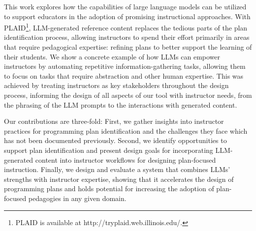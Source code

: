This work explores how the capabilities of large language models can be utilized to support educators in the adoption of promising instructional approaches.
With PLAID\footnote{PLAID is available at http://tryplaid.web.illinois.edu/.}, LLM-generated reference content replaces the tedious parts of the plan identification process, allowing instructors to spend their effort primarily in areas that require pedagogical expertise: refining plans to better support the learning of their students. We show a concrete example of how LLMs can empower instructors by automating repetitive information-gathering tasks, allowing them to focus on tasks that require abstraction and other human expertise. 
This was achieved by treating instructors as key stakeholders throughout the design process, informing the design of all aspects of our tool with instructor needs, from the phrasing of the LLM prompts to the interactions with generated content.


Our contributions are three-fold: 
First, we gather insights into instructor practices for programming plan identification and the challenges they face
which has not been documented previously. Second, we identify opportunities to support plan identification and present design goals for incorporating LLM-generated content into instructor workflows for designing plan-focused instruction.
Finally, we design and evaluate a system that combines LLMs' strengths with instructor expertise, showing that it accelerates the design of programming plans and holds potential for increasing the adoption of plan-focused pedagogies in any given domain. 

